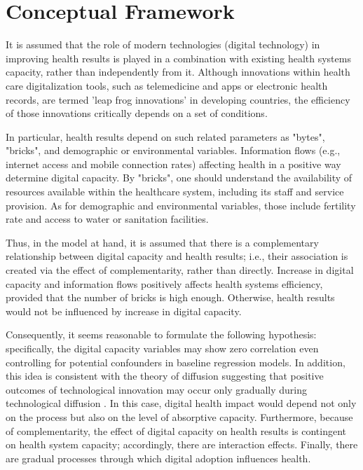\documentclass[12pt]{article}
\begin{document}
\section{Conceptual Framework}

It is assumed that the role of modern technologies (digital technology) in improving health results is played in a combination with existing health systems capacity, rather than independently from it. Although innovations within health care digitalization tools, such as telemedicine and apps or electronic health records, are termed 'leap frog innovations' in developing countries, the efficiency of those innovations critically depends on a set of conditions.

\medskip
In particular, health results depend on such related parameters as "bytes", "bricks", and demographic or environmental variables. Information flows (e.g., internet access and mobile connection rates) affecting health in a positive way determine digital capacity. By "bricks", one should understand the availability of resources available within the healthcare system, including its staff and service provision. As for demographic and environmental variables, those include fertility rate and access to water or sanitation facilities.

\medskip
Thus, in the model at hand, it is assumed that there is a complementary relationship between digital capacity and health results; i.e., their association is created via the effect of complementarity, rather than directly. Increase in digital capacity and information flows positively affects health systems efficiency, provided that the number of bricks is high enough. Otherwise, health results would not be influenced by increase in digital capacity.

\medskip
Consequently, it seems reasonable to formulate the following hypothesis: specifically, the digital capacity variables may show zero correlation even controlling for potential confounders in baseline regression models. In addition, this idea is consistent with the theory of diffusion suggesting that positive outcomes of technological innovation may occur only gradually during technological diffusion \citep{rogers2003}. In this case, digital health impact would depend not only on the process but also on the level of absorptive capacity. Furthermore, because of complementarity, the effect of digital capacity on health results is contingent on health system capacity; accordingly, there are interaction effects. Finally, there are gradual processes through which digital adoption influences health.
\end{document}
